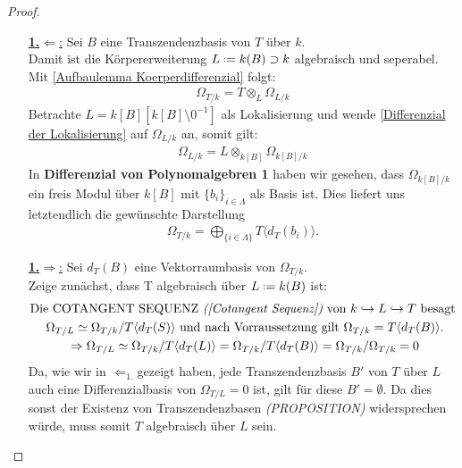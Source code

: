 \documentclass[10pt,a4paper]{report}
\newcommand{\comment}[1]{}
\newcommand{\divR}[2]{\Omega_{#1/#2}}
\newcommand{\divf}[1]{d_{#1}}
\newcommand{\Tensor}[3]{#1 \otimes_{#2} #3}
\newcommand{\lok}[2]{#1 [#2^{-1}]}
\newcommand*{\defeq}{\mathrel{\vcenter{\baselineskip0.5ex \lineskiplimit0pt
                     \hbox{\scriptsize.}\hbox{\scriptsize.}}}%
                     =}
\newcommand{\Verz}[1]{\langle #1 \rangle}
\begin{document}
\begin{proof}
\ \\
\begin{itemize}
\item[\underline{\textbf{1.}\glqq$\Leftarrow$\grqq:}] Sei $B$ eine Transzendenzbasis von $T$ über $k$.\\
Damit ist die Körpererweiterung $L \defeq k(B) \supset k$ algebraisch und seperabel. \comment{ mit \label{*Transzendenzbasisdef}} Mit \cref{Aufbaulemma Koerperdifferenzial} folgt:
\begin{gather*}
\divR{T}{k} = \Tensor{T}{L}{\divR{L}{k}}
\end{gather*}
Betrachte $L = \lok{k[B]}{k[B] \setminus 0}$ als Lokalisierung und wende \cref{Differenzial der Lokalisierung} auf $\divR{L}{k}$ an, somit gilt:
\begin{gather*}
\divR{L}{k} = \Tensor{L}{k[B]}{\divR{k[B]}{k}}
\end{gather*}
In \textbf{Differenzial von Polynomalgebren 1} \comment{\label{*Differenzial von Polynomalgebren brauche ich für unendliche Mengen Lambda}\cref{Differenzial von Polynomalgebren 1}} haben wir gesehen, dass $\divR{k[B]}{k}$ ein freis Modul über $k[B]$ mit $\lbrace b_i \rbrace_{i \in \Lambda}$ als Basis ist. Dies liefert uns letztendlich die gewünschte Darstellung
\begin{gather*}
\divR{T}{k} = \bigoplus_{\lbrace i \in \Lambda \rbrace} T \Verz{\divf{T}(b_i)}.
\end{gather*}
\item[\underline{\textbf{1.}\glqq$\Rightarrow$\grqq:}]Sei $\divf{T}(B)$ eine Vektorraumbasis von $\divR{T}{k}$.\\
Zeige zunächst, dass T algebraisch über $L \defeq k(B)$ ist:
\begin{gather*}
\text{Die COTANGENT SEQUENZ \textit{(\cref{Cotangent Sequenz})} von $k \hookrightarrow L \hookrightarrow T$ besagt }\\
\divR{T}{L} \simeq \divR{T}{k}/T \Verz{\divf{T}(S)} \text{ und nach Vorraussetzung gilt } \divR{T}{k} = T \Verz{\divf{T}(B)}.
\\
\Rightarrow \divR{T}{L} \simeq \divR{T}{k}/T\Verz{\divf{T}(L)} = \divR{T}{k}/T\Verz{\divf{T}(B)}=
\divR{T}{k}/\divR{T}{k} = 0
\end{gather*}
Da, wie wir in \glqq$\Leftarrow_{1.}$\grqq gezeigt haben, jede Transzendenzbasis $B'$ von $T$ über $L$ auch eine Differenzialbasis von $\divR{T}{L} = 0$ ist, gilt für diese $B' = \emptyset$. Da dies sonst der Existenz von Transzendenzbasen \textit{(PROPOSITION)} \comment{\label{*Transzendenzbasis existiert immer}} widersprechen würde, muss somit $T$ algebraisch über $L$ sein.\\

\end{itemize}
\end{proof}
\end{document}
